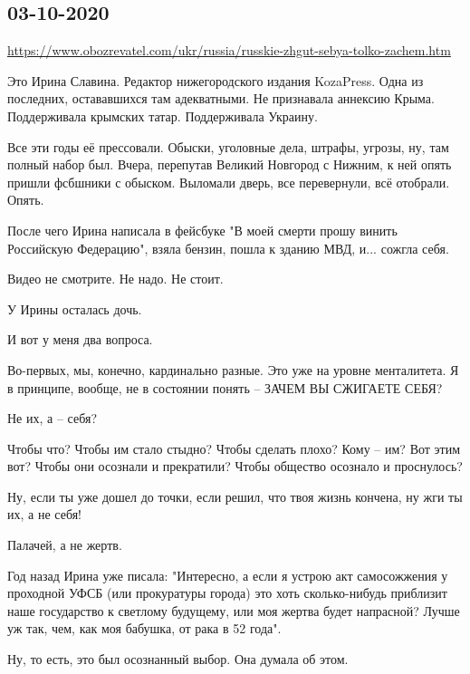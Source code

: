  
 

\subsection{03-10-2020}

\url{https://www.obozrevatel.com/ukr/russia/russkie-zhgut-sebya-tolko-zachem.htm}

Это Ирина Славина. Редактор нижегородского издания KozaPress. Одна из
последних, остававшихся там адекватными. Не признавала аннексию Крыма.
Поддерживала крымских татар. Поддерживала Украину.

Все эти годы её прессовали. Обыски, уголовные дела, штрафы, угрозы, ну, там
полный набор был. Вчера, перепутав Великий Новгород с Нижним, к ней опять
пришли фсбшники с обыском. Выломали дверь, все перевернули, всё отобрали.
Опять.

После чего Ирина написала в фейсбуке "В моей смерти прошу винить Российскую
Федерацию", взяла бензин, пошла к зданию МВД, и... сожгла себя.

Видео не смотрите. Не надо. Не стоит.

У Ирины осталась дочь.

И вот у меня два вопроса.

Во-первых, мы, конечно, кардинально разные. Это уже на уровне менталитета. Я в
принципе, вообще, не в состоянии понять – ЗАЧЕМ ВЫ СЖИГАЕТЕ СЕБЯ?

Не их, а – себя?

Чтобы что? Чтобы им стало стыдно? Чтобы сделать плохо? Кому – им? Вот этим вот?
Чтобы они осознали и прекратили? Чтобы общество осознало и проснулось?

Ну, если ты уже дошел до точки, если решил, что твоя жизнь кончена, ну жги ты
их, а не себя!

Палачей, а не жертв.

Год назад Ирина уже писала: "Интересно, а если я устрою акт самосожжения у
проходной УФСБ (или прокуратуры города) это хоть сколько-нибудь приблизит наше
государство к светлому будущему, или моя жертва будет напрасной? Лучше уж так,
чем, как моя бабушка, от рака в 52 года".

Ну, то есть, это был осознанный выбор. Она думала об этом.

